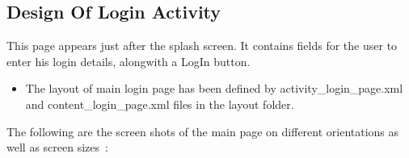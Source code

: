 \documentclass{article}
\begin{document}

\subsection{Design Of Login Activity}
\par\noindent This page appears just after the splash screen. It contains fields for the user to enter his login details, alongwith a LogIn button.
\begin{itemize}
\item The layout of main login page has been defined by activity\_login\_page.xml and content\_login\_page.xml files in the layout folder.

\end{itemize} 

\par\noindent The following are the screen shots of the main page on different orientations as well as screen sizes~\cite{figures_in_latex}:


\end{document}
